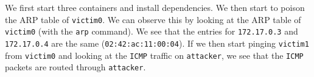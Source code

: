 We first start three containers and install dependencies. We then start to poison the ARP table of \lstinline{victim0}. We can observe this by looking at the ARP table of \lstinline{victim0} (with the \lstinline{arp} command). We see that the entries for \lstinline{172.17.0.3} and \lstinline{172.17.0.4} are the same (\lstinline{02:42:ac:11:00:04}). If we then start pinging \lstinline{victim1} from \lstinline{victim0} and looking at the \lstinline{ICMP} traffic on \lstinline{attacker}, we see that the \lstinline{ICMP} packets are routed through \lstinline{attacker}.
